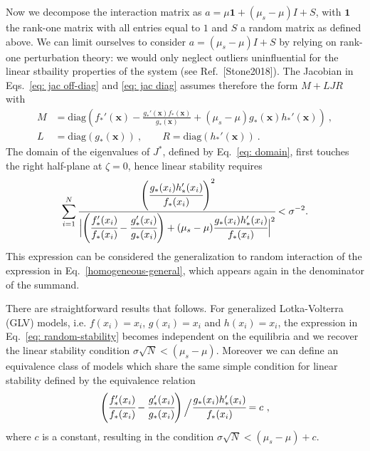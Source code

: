 \documentclass[%
 reprint,
 amsmath,amssymb,
 aps,
]{revtex4-2}
\begin{document}
Now we decompose the interaction matrix as
$a = \mu \mathbf{1} + (\mu_s-\mu)I + S$,
with $\mathbf{1}$ the rank-one matrix with all entries equal to $1$
and $S$ a random matrix as defined above.
We can limit ourselves to consider 
$a = (\mu_s-\mu)I + S$ by relying on 
rank-one perturbation theory: we would only neglect outliers
uninfluential for the linear stbaility properties of the system (see Ref.~[Stone2018]).
The Jacobian in Eqs.~\eqref{eq: jac off-diag} and \eqref{eq: jac diag} assumes therefore the form $M + LJR$ with
\begin{align}
    M & = \textrm{diag}\left(f_*'(\mathbf x) -
    \frac{g_*'(\mathbf x)f_*(\mathbf x)}{g_*(\mathbf x)}
    +(\mu_s-\mu)g_*(\mathbf x)h_*'(\mathbf x)\right) \ , \\
    L &= \textrm{diag}(g_*(\mathbf x)) \ , \qquad  
    R = \textrm{diag}(h_*'(\mathbf x)) \ . \nonumber
\end{align}
The domain of the eigenvalues of $J^*$, defined by
Eq.~\eqref{eq: domain}, 
first touches the right half-plane at $\zeta = 0$, 
hence linear stability requires   
\begin{equation}\label{eq: random-stability}
    \sum_{i=1}^N \cfrac{\left(\cfrac{g_*(x_i)h_*'(x_i)}{f_*(x_i)}\right)^2}{
        \Bigl |\left(\cfrac{f_*'(x_i)}{f_*(x_i)} -
        \cfrac{g_*'(x_i)}{g_*(x_i)}\right)
        +(\mu_s-\mu) \cfrac{g_*(x_i)h_*'(x_i)}{f_*(x_i)} \Bigl |^2}
    < \sigma^{-2}. 
\end{equation}
This expression can be considered the
generalization to random interaction of
the expression in Eq.~\eqref{homogeneous-general},
which appears again in the denominator of the summand.

There are straightforward results that follows.
For generalized Lotka-Volterra (GLV) models,
i.e. $f(x_i)=x_i$, $g(x_i)=x_i$ and $h(x_i)=x_i$,
the expression in Eq.~\eqref{eq: random-stability}
becomes independent on the equilibria and we 
recover the linear stability condition
$\sigma\sqrt{N} < (\mu_s-\mu)$.
Moreover we can define an equivalence class of models
which share the same simple condition
for linear stability defined by the equivalence relation
\begin{equation}\label{eq: equiv class glv}
    \left(\cfrac{f_*'(x_i)}{f_*(x_i)} -
        \cfrac{g_*'(x_i)}{g_*(x_i)}\right)\Bigl/
        \cfrac{g_*(x_i)h_*'(x_i)}{f_*(x_i)}=c \ ,
\end{equation}
where $c$ is a constant,
resulting in the condition $\sigma\sqrt{N} < (\mu_s-\mu) +c$.
\end{document}
